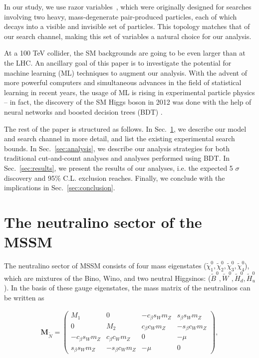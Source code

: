 \documentclass[a4paper,11pt]{article}
\renewcommand{\H}{\widetilde{H}^0}
\newcommand{\B}{\widetilde{B}^0}
\newcommand{\N}{\widetilde{\chi}^0}
\begin{document}
In our study, we use razor variables~\cite{Rogan:2010kb}, which were originally designed
for searches involving two heavy, mass-degenerate pair-produced
particles, each of which decays into a visible and invisible set of
particles. This topology matches that of our search channel, making this
set of variables a natural choice for our analysis.  

At a 100 TeV collider, the  SM backgrounds are going to be even larger than
at the LHC.  An ancillary goal of this paper is to investigate the
potential for machine learning (ML) techniques to augment our analysis.
With the advent of more powerful computers and simultaneous advances in
the field of statistical learning in recent years, the usage of ML is
rising in experimental particle physics -- in fact, the discovery of the
SM Higgs boson in 2012 was done with the help of neural networks
\cite{Aad:2012tfa} and boosted decision trees (BDT)
\cite{Chatrchyan:2012xdj}.

The rest of the paper is structured as follows. In Sec.~\ref{sec:model}, we
describe our model and search channel in more detail, and list the existing
experimental search bounds. In Sec.~\ref{sec:analysis}, we describe our
analysis strategies for both traditional cut-and-count analyses and analyses
performed using BDT. In Sec.~\ref{sec:results}, we present the results of our
analyses, i.e. the expected 5 $\sigma$ discovery and 95\% C.L. exclusion
reaches. Finally, we conclude with the implications in
Sec.~\ref{sec:conclusion}.

\section{The neutralino sector of the MSSM}
\label{sec:model}

 
The neutralino sector of MSSM consists of four mass eigenstates
($\N_1,\N_2,\N_3,\N_4$), which are mixtures of the Bino, Wino, and two neutral
Higgsinos: ($\B,\widetilde{W}^0,\H_d,\H_u$). In the basis of these gauge
eigenstates, the mass matrix of the neutralinos can be written as

\newcommand{\cb}{ c_\beta}
\newcommand{\cw}{ c_W}
\newcommand{\sinb}{ s_\beta}
\newcommand{\sw}{ s_W}
\newcommand{\mz}{ m_Z}

\begin{align}
  \mathbf{M}_{\widetilde{N}}=
  \begin{pmatrix}
    M_1         & 0            & -\cb\sw\mz & \sinb\sw\mz \\
    0           & M_2          & \cb\cw\mz  & -\sinb\cw\mz \\
    -\cb\sw\mz  & \cb\cw\mz    & 0          & -\mu \\
    \sinb\sw\mz & -\sinb\cw\mz & -\mu       & 0
  \end{pmatrix},
\end{align}
\end{document}
